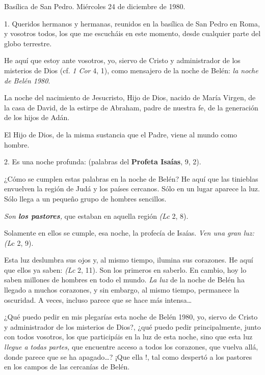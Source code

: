 \begin{body}
\begin{body}
Basílica de San Pedro. Miércoles 24 de diciembre de 1980.

1. Queridos hermanos y hermanas, reunidos en la basílica de San Pedro en Roma, y vosotros todos, los que me escucháis en este momento, desde cualquier parte del globo terrestre.

He aquí que estoy ante vosotros, yo, siervo de Cristo y administrador de los misterios de Dios (cf. \emph{1 Cor} 4, 1), como mensajero de la noche de Belén: \emph{la noche de Belén 1980}.

La noche del nacimiento de Jesucristo, Hijo de Dios, nacido de María Virgen, de la casa de David, de la estirpe de Abraham, padre de nuestra fe, de la generación de los hijos de Adán.

El Hijo de Dios, de la misma sustancia que el Padre, viene al mundo como hombre.

2. Es una noche profunda:  (palabras del \textbf{Profeta Isaías}, 9, 2).

¿Cómo se cumplen estas palabras en la noche de Belén? He aquí que las tinieblas envuelven la región de Judá y los países cercanos. Sólo en un lugar aparece la luz. Sólo llega a un pequeño grupo de hombres sencillos.

\emph{Son \textbf{los pastores},} que estaban en aquella región  \emph{(Lc} 2, 8).

Solamente en ellos se cumple, esa noche, la profecía de Isaías. \emph{Ven una gran luz:}  \emph{(L}c 2, 9).

Esta luz deslumbra sus ojos y, al mismo tiempo, ilumina sus corazones. He aquí que ellos ya saben:  \emph{(Lc} 2, 11). Son los primeros en saberlo. En cambio, hoy lo saben millones de hombres en todo el mundo. \emph{La luz} de la noche de Belén ha llegado a muchos corazones, y sin embargo, al mismo tiempo, permanece la oscuridad. A veces, incluso parece que se hace más intensa\ldots{}

¿Qué puedo pedir en mis plegarías esta noche de Belén 1980, yo, siervo de Cristo y administrador de los misterios de Dios?, ¿qué puedo pedir principalmente, junto con todos vosotros, los que participáis en la luz de esta noche, sino que esta luz \emph{llegue a todas partes,} que encuentre acceso a todos los corazones, que vuelva allá, donde parece que se ha apagado\ldots{}? ¡Que ella !, tal como despertó a los pastores en los campos de las cercanías de Belén.


\end{body}
\end{body}
